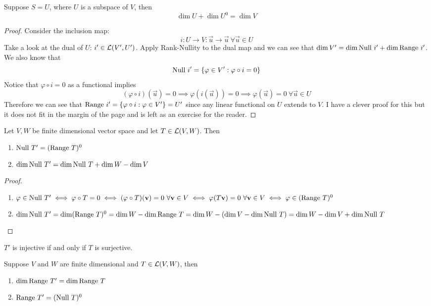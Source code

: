 \begin{theorem}
    Suppose $S = U$, where $U$ is a subspace of $V$, then 
    \[ \dim U + \dim U^0 = \dim V\]
\end{theorem}
\begin{proof}
    Consider the inclusion map: \[i : U \to V : \vec u \to \vec u \ \forall \vec u \in U\] 
    Take  a look at the dual of $U$: $i' \in \mathcal L(V', U')$. Apply Rank-Nullity to the dual map and we can see that $\dim V' = \dim \text{Null } i' + \dim \text{Range } i'$. We also know that \[\text{Null } i' = \left\{ \varphi \in V' : \varphi \circ i = 0 \right\}\] Notice that $\varphi \circ i = 0$ as a functional implies \[(\varphi \circ i) (\vec u) = 0 \implies \varphi(i(\vec u)) = 0 \implies \varphi(\vec u) = 0 \ \forall \vec u \in U \]
    Therefore we can see that $\text{Range } i' = \left\{ \varphi \circ i : \varphi \in V' \right\} = U'$ since any linear functional on $U$ extends to $V$. I have a clever proof for this but it does not fit in the margin of the page and is left as an exercise for the reader. 
\end{proof}
\begin{theorem}
    Let $V,W$ be finite dimensional vector space and let $T \in \mathcal L(V,W)$. Then 
    \begin{enumerate}[label = (\alph*)]
        \item $\text{Null } T' = (\text{Range } T)^0$
        \item $\dim \text{Null } T' = \dim \text{Null } T + \dim W - \dim V$
    \end{enumerate}
\end{theorem}
\begin{proof} $ $
    \begin{enumerate}[label = (\alph*)]
        \item $\varphi \in \text{Null } T' \iff \varphi \circ T = 0 \iff (\varphi \circ T)(\mathbf v) = 0 \ \forall \mathbf v \in V \iff \varphi(T\mathbf v) = 0 \ \forall \mathbf v \in V \\ \iff \varphi \in (\text{Range } T)^0$
        \item $\dim \text{Null } T' = \dim (\text{Range } T)^0 = \dim W - \dim \text{Range } T = \dim W - (\dim V - \dim \text{Null } T) = \dim W - \dim V + \dim \text{Null } T$
    \end{enumerate}
\end{proof}
\begin{corollary}
    $T'$ is injective if and only if $T$ is surjective.
\end{corollary}
\begin{theorem}
    Suppose $V$ and $W$ are finite dimensional and $T \in \mathcal L(V,W)$, then 
    \begin{enumerate}[label = (\alph*)]
        \item $\dim \text{Range } T' = \dim \text{Range } T$
        \item $\text{Range } T' = (\text{Null } T)^0$
    \end{enumerate}
\end{theorem}
